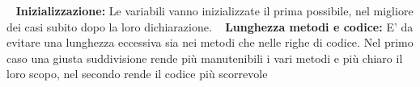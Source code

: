 	~\newline
	\textbf{Inizializzazione:} Le variabili vanno inizializzate il prima possibile, nel migliore dei casi subito dopo la loro dichiarazione. \newline
	~\newline
	\textbf{Lunghezza metodi e codice:} E' da evitare una lunghezza eccessiva sia nei metodi che nelle righe di codice. Nel primo caso una giusta suddivisione rende più manutenibili i vari metodi e più chiaro il loro scopo, nel secondo rende il codice più scorrevole \newline